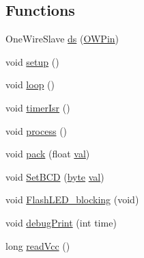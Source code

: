\subsection*{Functions}
\begin{DoxyCompactItemize}
\item 
One\-Wire\-Slave \hyperlink{OWGeneric__DangerShield_8ino_a29dc68449cb5938be210109740e26ce3}{ds} (\hyperlink{OWRain1_8ino_a7f5aa1ac0711ae18877a165a9bf24625}{O\-W\-Pin})
\item 
void \hyperlink{OWGeneric__DangerShield_8ino_a4fc01d736fe50cf5b977f755b675f11d}{setup} ()
\item 
void \hyperlink{OWGeneric__DangerShield_8ino_afe461d27b9c48d5921c00d521181f12f}{loop} ()
\item 
void \hyperlink{OWGeneric__DangerShield_8ino_ad97e1651258f04ff0c1f74136910ce2d}{timer\-Isr} ()
\item 
void \hyperlink{OWGeneric__DangerShield_8ino_a2e9c5136d19b1a95fc427e0852deab5c}{process} ()
\item 
void \hyperlink{OWGeneric__DangerShield_8ino_a097292225769f56d224f441fee48cbdb}{pack} (float \hyperlink{Uno__Read__CurrentTransformer__SCT__013__030_8ino_aa0ccb5ee6d882ee3605ff47745c6467b}{val})
\item 
void \hyperlink{OWGeneric__DangerShield_8ino_a4a08de21b6e4d4a4613bd3a331c45309}{Set\-B\-C\-D} (\hyperlink{Arduino_8h_ab8ef12fab634c171394422d0ee8baf94}{byte} \hyperlink{Uno__Read__CurrentTransformer__SCT__013__030_8ino_aa0ccb5ee6d882ee3605ff47745c6467b}{val})
\item 
void \hyperlink{OWGeneric__DangerShield_8ino_a4833df7e1a798440cec59dfdf6d1eaf9}{Flash\-L\-E\-D\-\_\-blocking} (void)
\item 
void \hyperlink{OWGeneric__DangerShield_8ino_aea2efd3e27dd82d17fd923d99287f981}{debug\-Print} (int time)
\item 
long \hyperlink{OWGeneric__DangerShield_8ino_a8e23c9421f6663303ea22e4969e2f6c1}{read\-Vcc} ()
\end{DoxyCompactItemize}
